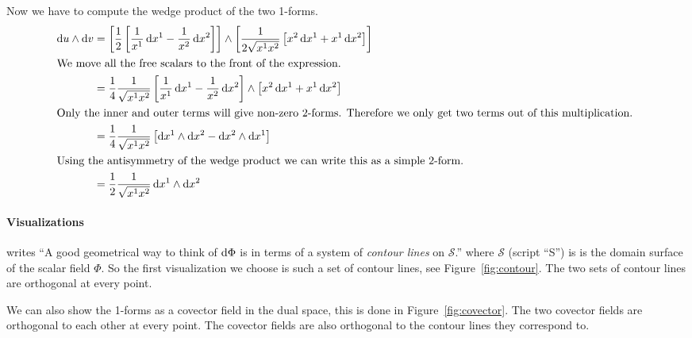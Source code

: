 \documentclass[11pt, english, fleqn, DIV=15, headinclude, BCOR=1cm]{scrartcl}
\begin{document}
Now we have to compute the wedge product of the two 1-forms.
\begin{align*}
    \dif u \wedge \dif v
    &= \sbr{\frac12 \sbr{\frac{1}{x^1} \dif x^1 - \frac{1}{x^2} \dif x^2}}
    \wedge \sbr{\frac{1}{2 \sqrt{x^1 x^2}} \sbr{x^2 \dif x^1 + x^1 \dif x^2}}
    \\
    \intertext{%
        We move all the free scalars to the front of the expression.
    }
    &= \frac14 \frac{1}{\sqrt{x^1 x^2}} \sbr{\frac{1}{x^1} \dif x^1 - \frac{1}{x^2} \dif x^2}
    \wedge \sbr{x^2 \dif x^1 + x^1 \dif x^2}
    \\
    \intertext{%
        Only the inner and outer terms will give non-zero 2-forms. Therefore we
        only get two terms out of this multiplication.
    }
    &= \frac14 \frac{1}{\sqrt{x^1 x^2}} \sbr{\dif x^1 \wedge \dif x^2 - \dif
    x^2 \wedge \dif x^1} \\
    \intertext{%
        Using the antisymmetry of the wedge product we can write this as a
        simple 2-form.
    }
    &= \frac12 \frac{1}{\sqrt{x^1 x^2}} \dif x^1 \wedge \dif x^2
\end{align*}

\paragraph{Visualizations}

\Textcite[189]{penrose-road_to_reality} writes “A good geometrical way to think
of $\mathop{}\!\mathrm d \Phi$ is in terms of a system of \emph{contour lines} on $\mathscr
S$.” where $\mathscr S$ (script “S”) is is the domain surface of the scalar
field $\Phi$. So the first visualization we choose is such a set of contour
lines, see Figure~\ref{fig:contour}. The two sets of contour lines are
orthogonal at every point.

We can also show the 1-forms as a covector field in the dual space, this is
done in Figure~\ref{fig:covector}. The two covector fields are orthogonal to
each other at every point. The covector fields are also orthogonal to the
contour lines they correspond to.
\end{document}
